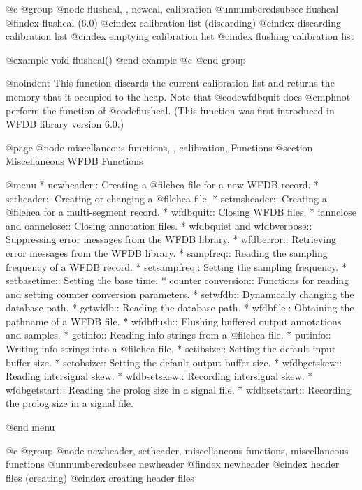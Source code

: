 {{{{{{{{{@c @group
@node    flushcal, , newcal, calibration
@unnumberedsubsec flushcal
@findex flushcal (6.0)
@cindex calibration list (discarding)
@cindex discarding calibration list
@cindex emptying calibration list
@cindex flushing calibration list

@example
void flushcal()
@end example
@c @end group

@noindent
This function discards the current calibration list and returns the
memory that it occupied to the heap.  Note that @code{wfdbquit} does
@emph{not} perform the function of @code{flushcal}.  (This function was
first introduced in WFDB library version 6.0.)

@page
@node    miscellaneous functions, , calibration, Functions
@section Miscellaneous WFDB Functions

@menu
* newheader::			Creating a @file{hea} file for a new WFDB
				record.
* setheader::			Creating or changing a @file{hea} file.
* setmsheader::                 Creating a @file{hea} for a multi-segment
                                record.
* wfdbquit::			Closing WFDB files.
* iannclose and oannclose::     Closing annotation files.
* wfdbquiet and wfdbverbose::	Suppressing error messages from the WFDB library.
* wfdberror::			Retrieving error messages from the WFDB library.
* sampfreq::			Reading the sampling frequency of a WFDB record.
* setsampfreq::			Setting the sampling frequency.
* setbasetime::			Setting the base time.
* counter conversion::		Functions for reading and setting counter
				conversion parameters.
* setwfdb::			Dynamically changing the database path.
* getwfdb::			Reading the database path.
* wfdbfile::			Obtaining the pathname of a WFDB file.
* wfdbflush::			Flushing buffered output annotations and
				samples.
* getinfo::			Reading info strings from a @file{hea} file.
* putinfo::			Writing info strings into a @file{hea} file.
* setibsize::			Setting the default input buffer size.
* setobsize::			Setting the default output buffer size.
* wfdbgetskew::                 Reading intersignal skew.
* wfdbsetskew::                 Recording intersignal skew.
* wfdbgetstart::                Reading the prolog size in a signal file.
* wfdbsetstart::                Recording the prolog size in a signal file.

@end menu

@c @group
@node     newheader, setheader, miscellaneous functions, miscellaneous functions
@unnumberedsubsec newheader
@findex newheader
@cindex header files (creating)
@cindex creating header files

}}}}}}}}}
